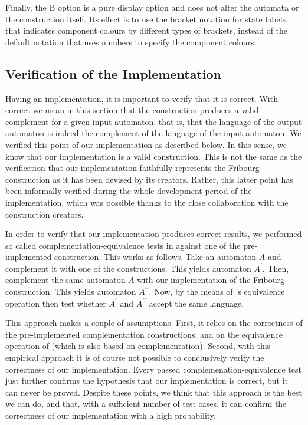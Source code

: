 Finally, the B option is a pure display option and does not alter the automata or the construction itself. Its effect is to use the bracket notation for state labels, that indicates component colours by different types of brackets, instead of the default notation that uses numbers to specify the component colours.


\subsection{Verification of the Implementation}
\label{4_verification}
Having an implementation, it is important to verify that it is correct. With correct we mean in this section that the construction produces a valid complement for a given input automaton, that is, that the language of the output automaton is indeed the complement of the language of the input automaton. We verified this point of our implementation as described below. In this sense, we know that our implementation is a valid construction. This is not the same as the verification that our implementation faithfully represents the Fribourg construction as it has been devised by its creators. Rather, this latter point has been informally verified during the whole development period of the implementation, which was possible thanks to the close collaboration with the construction creators.

In order to verify that our implementation produces correct results, we performed so called complementation-equivalence tests in \goal{} against one of the pre-implemented construction. This works as follows. Take an automaton $A$ and complement it with one of the \goal{} constructions. This yields automaton $A^\prime$. Then, complement the same automaton $A$ with our implementation of the Fribourg construction. This yields automaton $A^{\prime\prime}$. Now, by the means of \goal's equivalence operation then test whether $A^\prime$ and $A^{\prime\prime}$ accept the same language.

This approach makes a couple of assumptions. First, it relies on the correctness of the pre-implemented complementation constructions, and on the equivalence operation of \goal{} (which is also based on complementation). Second, with this empirical approach it is of course not possible to conclusively verify the correctness of our implementation. Every passed complemenation-equivalence test just further confirms the hypothesis that our implementation is correct, but it can never be proved. Despite these points, we think that this approach is the best we can do, and that, with a sufficient number of test cases, it can confirm the correctness of our implementation with a high probability.

